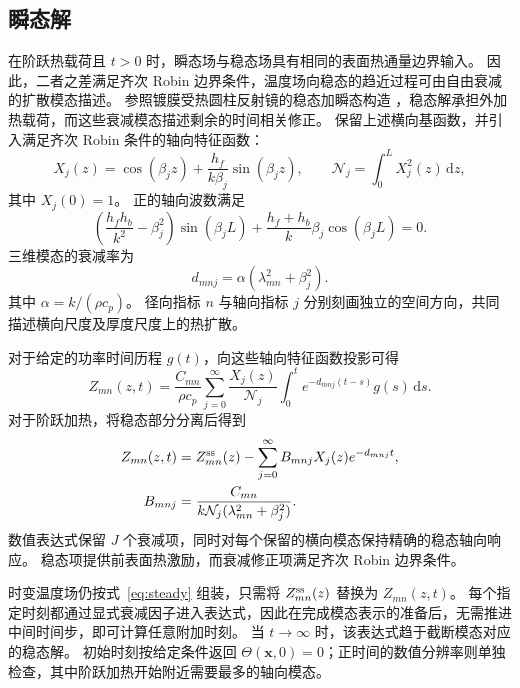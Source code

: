 \documentclass{optica-article}
\newcommand{\dd}{\,\mathrm{d}}
\begin{document}
\subsection{瞬态解}\label{sec:transient}
在阶跃热载荷且 $t>0$ 时，瞬态场与稳态场具有相同的表面热通量边界输入。
因此，二者之差满足齐次 Robin 边界条件，温度场向稳态的趋近过程可由自由衰减的扩散模态描述。
参照镀膜受热圆柱反射镜的稳态加瞬态构造 \cite{hellovinet1990}，稳态解承担外加热载荷，而这些衰减模态描述剩余的时间相关修正。
保留上述横向基函数，并引入满足齐次 Robin 条件的轴向特征函数：
\begin{equation}
 X_j(z)=\cos(\beta_jz)+\frac{h_f}{k\beta_j}\sin(\beta_jz),\qquad
 \mathcal N_j=\int_0^L X_j^2(z)\dd z,
 \label{eq:axialmodes}
\end{equation}
其中 $X_j(0)=1$。
正的轴向波数满足
\begin{equation}
 \left(\frac{h_fh_b}{k^2}-\beta_j^2\right)\sin(\beta_jL)
  +\frac{h_f+h_b}{k}\beta_j\cos(\beta_jL)=0.
 \label{eq:axialroots}
\end{equation}
三维模态的衰减率为
\begin{equation}
 d_{mnj}=\alpha(\lambda_{mn}^2+\beta_j^2).
 \label{eq:rate}
\end{equation}
其中 $\alpha=k/(\rho c_p)$。
径向指标 $n$ 与轴向指标 $j$ 分别刻画独立的空间方向，共同描述横向尺度及厚度尺度上的热扩散。

对于给定的功率时间历程 $g(t)$，向这些轴向特征函数投影可得
\begin{equation}
 Z_{mn}(z,t)=\frac{C_{mn}}{\rho c_p}
 \sum_{j=0}^{\infty}\frac{X_j(z)}{\mathcal N_j}
 \int_0^t e^{-d_{mnj}(t-s)}g(s)\dd s.
 \label{eq:convolution}
\end{equation}
对于阶跃加热，将稳态部分分离后得到
\begin{align}
 Z_{mn}(z,t)&=Z_{mn}^{\rm ss}(z)
       -\sum_{j=0}^{\infty}B_{mnj}X_j(z)e^{-d_{mnj}t},\label{eq:completion}\\
 B_{mnj}&=\frac{C_{mn}}{k\mathcal N_j(\lambda_{mn}^2+\beta_j^2)}.\nonumber
\end{align}
数值表达式保留 $J$ 个衰减项，同时对每个保留的横向模态保持精确的稳态轴向响应。
稳态项提供前表面热激励，而衰减修正项满足齐次 Robin 边界条件。

时变温度场仍按式~\eqref{eq:steady} 组装，只需将 $Z_{mn}^{\rm ss}(z)$ 替换为 $Z_{mn}(z,t)$。
每个指定时刻都通过显式衰减因子进入表达式，因此在完成模态表示的准备后，无需推进中间时间步，即可计算任意附加时刻。
当 $t\to\infty$ 时，该表达式趋于截断模态对应的稳态解。
初始时刻按给定条件返回 $\Theta(\mathbf{x},0)=0$；正时间的数值分辨率则单独检查，其中阶跃加热开始附近需要最多的轴向模态。
\end{document}

